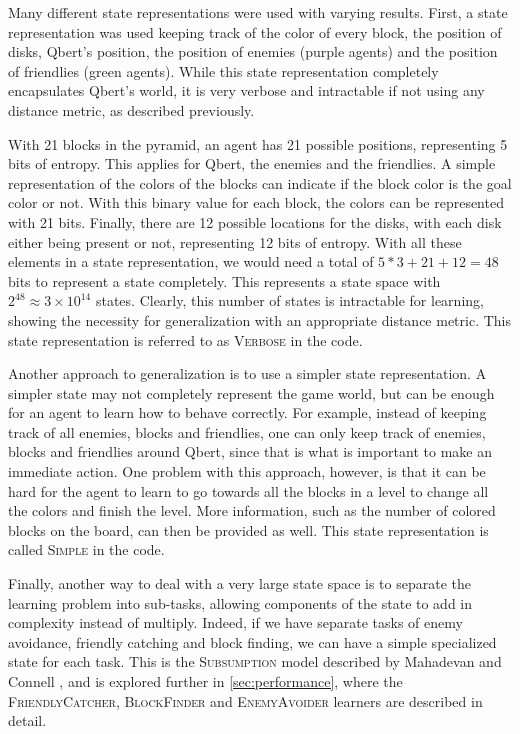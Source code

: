 \documentclass[a4paper,titlepage]{article}
\begin{document}
	Many different state representations were used with varying results. First, a state representation was used keeping track of the color of every block, the position of disks, Qbert's position, the position of enemies (purple agents) and the position of friendlies (green agents). While this state representation completely encapsulates Qbert's world, it is very verbose and intractable if not using any distance metric, as described previously.
	
	With 21 blocks in the pyramid, an agent has 21 possible positions, representing 5 bits of entropy. This applies for Qbert, the enemies and the friendlies. A simple representation of the colors of the blocks can indicate if the block color is the goal color or not. With this binary value for each block, the colors can be represented with 21 bits. Finally, there are 12 possible locations for the disks, with each disk either being present or not, representing 12 bits of entropy. With all these elements in a state representation, we would need a total of $5*3 + 21 + 12 = 48$ bits to represent a state completely. This represents a state space with $2^{48} \approx 3 \times 10^{14}$ states. Clearly, this number of states is intractable for learning, showing the necessity for generalization with an appropriate distance metric. This state representation is referred to as \textsc{Verbose} in the code.
	
	Another approach to generalization is to use a simpler state representation. A simpler state may not completely represent the game world, but can be enough for an agent to learn how to behave correctly. For example, instead of keeping track of all enemies, blocks and friendlies, one can only keep track of enemies, blocks and friendlies around Qbert, since that is what is important to make an immediate action. One problem with this approach, however, is that it can be hard for the agent to learn to go towards all the blocks in a level to change all the colors and finish the level. More information, such as the number of colored blocks on the board, can then be provided as well. This state representation is called \textsc{Simple} in the code.
	
	Finally, another way to deal with a very large state space is to separate the learning problem into sub-tasks, allowing components of the state to add in complexity instead of multiply. Indeed, if we have separate tasks of enemy avoidance, friendly catching and block finding, we can have a simple specialized state for each task. This is the \textsc{Subsumption} model described by Mahadevan and Connell \cite{mahadevan}, and is explored further in \cref{sec:performance}, where the \textsc{FriendlyCatcher}, \textsc{BlockFinder} and \textsc{EnemyAvoider} learners are described in detail.
	
\end{document}
